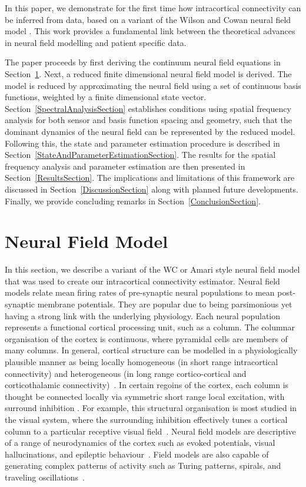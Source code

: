 \documentclass[12pt]{iopart}
\begin{document}
In this paper, we demonstrate for the first time how intracortical connectivity can be inferred from data, based on a variant of the Wilson and Cowan neural field model \cite{Wilson1973}. This work provides a fundamental link between the theoretical advances in neural field modelling and patient specific data.

The paper proceeds by first deriving the continuum neural field equations in Section~\ref{NeuralModelSection}. Next, a reduced finite dimensional neural field model is derived. The model is reduced by approximating the neural field using a set of continuous basis functions, weighted by a finite dimensional state vector. Section~\ref{SpectralAnalysisSection} establishes conditions using spatial frequency analysis for both sensor and basis function spacing and geometry, such that the dominant dynamics of the neural field can be represented by the reduced model. Following this, the state and parameter estimation procedure is described in Section~\ref{StateAndParameterEstimationSection}. The results for the spatial frequency analysis and parameter estimation are then presented in Section~\ref{ResultsSection}. The implications and limitations of this framework are discussed in Section~\ref{DiscussionSection} along with planned future developments. Finally, we provide concluding remarks in Section~\ref{ConclusionSection}.

\section{Neural Field Model}\label{NeuralModelSection} In this section, we describe a variant of the WC or Amari style neural field model \cite{Wilson1973,Amari1977} that was used to create our intracortical connectivity estimator. Neural field models relate mean firing rates of pre-synaptic neural populations to mean post-synaptic membrane potentials. They are popular due to being parsimonious yet having a strong link with the underlying physiology. Each neural population represents a functional cortical processing unit, such as a column. The columnar organisation of the cortex is continuous, where pyramidal cells are members of many columns. In general, cortical structure can be modelled in a physiologically plausible manner as being locally homogeneous (in short range intracortical connectivity) and heterogeneous (in long range cortico-cortical and corticothalamic connectivity)~\cite{Jirsa2009,Qubbaj2007}. In certain regoins of the cortex, each column is thought be connected locally via symmetric short range local excitation, with surround inhibition \cite{Braitenberg1998}. For example, this structural organisation is most studied in the visual system, where the surrounding inhibition effectively tunes a cortical column to a particular receptive visual field~\cite{Sullivan2006}. Neural field models are descriptive of a range of neurodynamics of the cortex such as evoked potentials, visual hallucinations, and epileptic behaviour~\cite{David2003,Bressloff2001,Breakspear2006}. 
Field models are also capable of generating complex patterns of activity such as Turing patterns, spirals, and traveling oscillations~\cite{Amari1977,Coombes2005,Coombes2007}.
\end{document}
